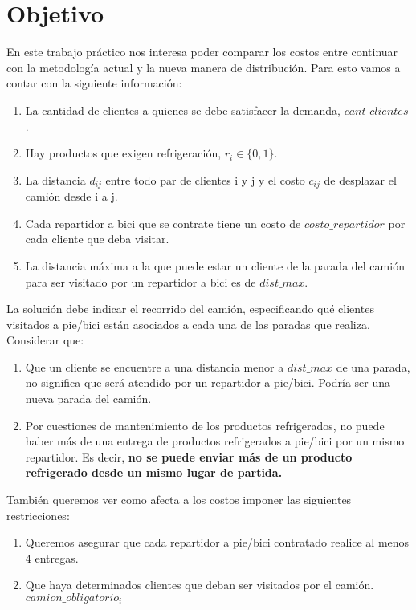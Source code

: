 \documentclass[11pt,a4paper]{article}
\begin{document}
\section*{Objetivo} {\small En este trabajo práctico nos interesa poder comparar los costos entre continuar con la metodología actual y la nueva manera de distribución. Para esto vamos a contar con la siguiente información:\\
\begin{enumerate}
    \item La cantidad de clientes a quienes se debe satisfacer la demanda, $cant\_clientes$.
\item Hay productos que exigen refrigeración, $r_i \in \{0,1\}$.
\item La distancia $d_{ij}$ entre todo par de clientes i y j y el costo $c_{ij}$ de desplazar el camión desde i a j.
\item Cada repartidor a bici que se contrate tiene un costo de $costo\_repartidor$ por cada cliente que deba visitar.
\item La distancia máxima a la que puede estar un cliente de la parada del camión para ser visitado por un repartidor
a bici es de $dist\_max$.
\end{enumerate}
La solución debe indicar el recorrido del camión, especificando qué clientes visitados a pie/bici están asociados a cada una de las paradas que realiza. Considerar que:
\begin{enumerate}
    \item Que un cliente se encuentre a una distancia menor a $dist\_max$ de una parada, no significa que será atendido
por un repartidor a pie/bici. Podría ser una nueva parada del camión.
\item Por cuestiones de mantenimiento de los productos refrigerados, no puede haber más de una entrega de productos refrigerados a pie/bici por un mismo repartidor. Es decir, \textbf{no se puede enviar más de un producto refrigerado desde un mismo lugar de partida.\\} \end{enumerate}

{También queremos ver como afecta a los costos imponer las siguientes restricciones:}

\begin{enumerate}[resume]
\item Queremos asegurar que cada repartidor a pie/bici contratado realice al menos 4 entregas.
\item Que haya determinados clientes que deban ser visitados por el camión. $camion\_obligatorio_i$
\end{enumerate}
}
\end{document}
